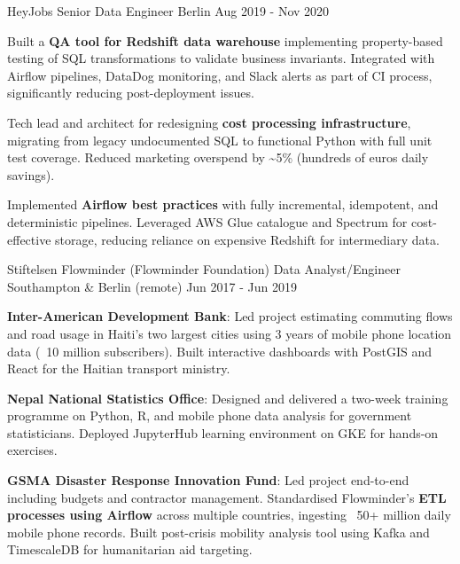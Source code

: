 \begin{cventries}
{\begin{cvitems}
      \end{cvitems}
    }
  \cventry
    {HeyJobs}
    {Senior Data Engineer}
    {Berlin} %
    {Aug 2019 - Nov 2020} %
    {
      \begin{cvitems} %
        \item {Built a \textbf{QA tool for Redshift data warehouse} implementing property-based testing of SQL transformations to validate business invariants. Integrated with Airflow pipelines, DataDog monitoring, and Slack alerts as part of CI process, significantly reducing post-deployment issues.}
        \item {Tech lead and architect for redesigning \textbf{cost processing infrastructure}, migrating from legacy undocumented SQL to functional Python with full unit test coverage. Reduced marketing overspend by \textasciitilde 5\% (hundreds of euros daily savings).}
        \item {Implemented \textbf{Airflow best practices} with fully incremental, idempotent, and deterministic pipelines. Leveraged AWS Glue catalogue and Spectrum for cost-effective storage, reducing reliance on expensive Redshift for intermediary data.}
      \end{cvitems}
    }

  \cventry
    {Stiftelsen Flowminder (Flowminder Foundation)}
    {Data Analyst/Engineer}
    {Southampton \& Berlin (remote)} %
    {Jun 2017 - Jun 2019} %
    {
      \begin{cvitems} %
        \item {\textbf{Inter-American Development Bank}: Led project estimating commuting flows and road usage in Haiti's two largest cities using 3 years of mobile phone location data (~10 million subscribers). Built interactive dashboards with PostGIS and React for the Haitian transport ministry.}
        \item {\textbf{Nepal National Statistics Office}: Designed and delivered a two-week training programme on Python, R, and mobile phone data analysis for government statisticians. Deployed JupyterHub learning environment on GKE for hands-on exercises.}
        \item {\textbf{GSMA Disaster Response Innovation Fund}: Led project end-to-end including budgets and contractor management. Standardised Flowminder's \textbf{ETL processes using Airflow} across multiple countries, ingesting ~50+ million daily mobile phone records. Built post-crisis mobility analysis tool using Kafka and TimescaleDB for humanitarian aid targeting.}
      \end{cvitems}
    }


\end{cventries}
